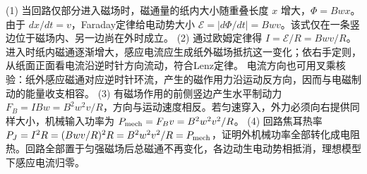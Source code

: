 (1) 当回路仅部分进入磁场时，磁通量的纸内大小随重叠长度 \(x\) 增大，\(\Phi=Bwx\)。由于 \(dx/dt=v\)，Faraday定律给电动势大小 \(\mathcal E=|d\Phi/dt|=Bwv\)。该式仅在一条竖边位于磁场内、另一边尚在外时成立。
(2) 通过欧姆定律得 \(I=\mathcal E/R=Bwv/R\)。进入时纸内磁通逐渐增大，感应电流应生成纸外磁场抵抗这一变化；依右手定则，从纸面正面看电流沿逆时针方向流动，符合Lenz定律。 电流方向也可用叉乘核验：纸外感应磁通对应逆时针环流，产生的磁作用力沿运动反方向，因而与电磁制动的能量收支相容。
(3) 有磁场作用的前侧竖边产生水平制动力 \(F_B=IBw=B^2w^2v/R\)，方向与运动速度相反。若匀速穿入，外力必须向右提供同样大小，机械输入功率为 \(P_{\rm mech}=F_Bv=B^2w^2v^2/R\)。
(4) 回路焦耳热率 \(P_J=I^2R=(Bwv/R)^2R=B^2w^2v^2/R=P_{\rm mech}\)，证明外机械功率全部转化成电阻热。回路全部置于匀强磁场后总磁通不再变化，各边动生电动势相抵消，理想模型下感应电流归零。

